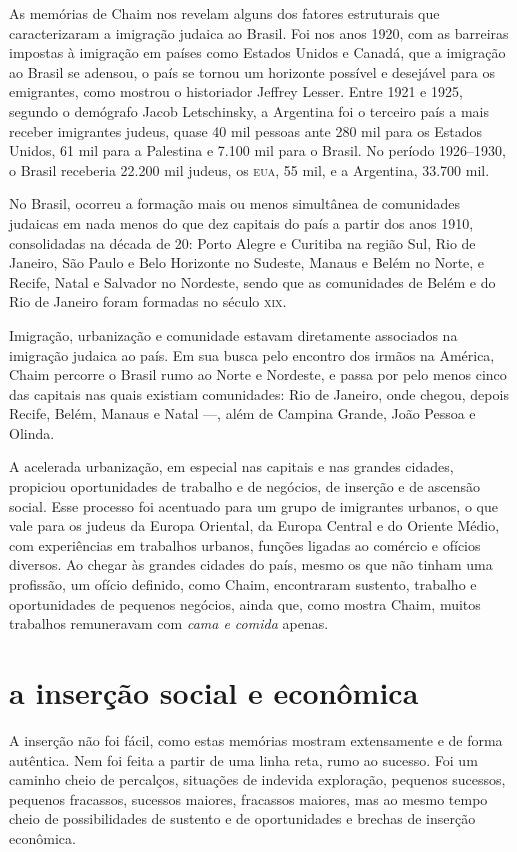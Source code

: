 As memórias de Chaim nos revelam alguns dos fatores estruturais que
caracterizaram a imigração judaica ao Brasil. Foi nos anos 1920, com as
barreiras impostas à imigração em países como Estados Unidos e Canadá,
que a imigração ao Brasil se adensou, o país se tornou um horizonte
possível e desejável para os emigrantes, como mostrou o historiador
Jeffrey Lesser. Entre 1921 e 1925, segundo o demógrafo Jacob
Letschinsky, a Argentina foi o terceiro país a mais receber imigrantes
judeus, quase 40 mil pessoas ante 280 mil para os Estados Unidos, 61 mil
para a Palestina e 7.100 mil para o Brasil. No período 1926--1930, o Brasil
receberia 22.200 mil judeus, os \textsc{eua}, 55 mil, e a Argentina, 33.700 mil.

No Brasil, ocorreu a formação mais ou menos simultânea de comunidades
judaicas em nada menos do que dez capitais do país a partir dos anos
1910, consolidadas na década de 20: Porto Alegre e Curitiba na região
Sul, Rio de Janeiro, São Paulo e Belo Horizonte no Sudeste, Manaus e
Belém no Norte, e Recife, Natal e Salvador no Nordeste, sendo que as
comunidades de Belém e do Rio de Janeiro foram formadas no século \textsc{xix}.

Imigração, urbanização e comunidade estavam diretamente associados na 
imigração judaica ao país. Em sua busca pelo encontro dos
irmãos na América, Chaim percorre o Brasil rumo ao Norte e Nordeste, e passa por pelo menos cinco das capitais nas quais existiam 
comunidades: Rio de Janeiro, onde chegou, depois Recife, Belém, Manaus e
Natal ---, além de Campina Grande, João Pessoa e Olinda.

A acelerada urbanização, em especial nas capitais e nas grandes cidades,
propiciou oportunidades de trabalho e de negócios, de inserção e de
ascensão social. Esse processo foi acentuado para um grupo de imigrantes
urbanos, o que vale para os judeus da Europa Oriental, da Europa Central
e do Oriente Médio, com experiências em trabalhos urbanos, funções
ligadas ao comércio e ofícios diversos. Ao chegar às grandes cidades do
país, mesmo os que não tinham uma profissão, um ofício definido, como
Chaim, encontraram sustento, trabalho e oportunidades de pequenos
negócios, ainda que, como mostra Chaim, muitos trabalhos remuneravam com
\textit{cama e comida} apenas.

\section{a inserção social e econômica}

A inserção não foi fácil, como estas memórias
mostram extensamente e de forma autêntica. Nem foi feita a partir de uma linha
reta, rumo ao sucesso. Foi um caminho cheio de percalços, situações de
indevida exploração, pequenos sucessos, pequenos fracassos, sucessos
maiores, fracassos maiores, mas ao mesmo tempo cheio de possibilidades
de sustento e de oportunidades e brechas de inserção econômica. 

